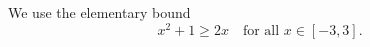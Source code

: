 \documentclass{article}
\begin{document}
We use the elementary bound
\[
x^2 + 1 \ge 2x \quad \text{for all } x \in [-3, 3].
\]
\end{document}
